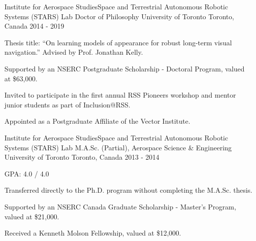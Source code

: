 

\begin{cventries}

  \cventry
    {Institute for Aerospace Studies{\enskip\cdotp\enskip}Space and Terrestrial Autonomous Robotic Systems (STARS) Lab} %
    {Doctor of Philosophy {\enskip\cdotp\enskip}University of Toronto} %
    {Toronto, Canada} %
    {2014 - 2019} %
    {
      \begin{cvitems} %
        \item {Thesis title: ``On learning models of appearance for robust long-term visual navigation.'' Advised by Prof. Jonathan Kelly.}
        \item {Supported by an NSERC Postgraduate Scholarship - Doctoral Program, valued at \$63,000.}
        \item {Invited to participate in the first annual RSS Pioneers workshop and mentor junior students as part of Inclusion@RSS.}
        \item {Appointed as a Postgraduate Affiliate of the Vector Institute.}
      \end{cvitems}
    }

  \cventry
    {Institute for Aerospace Studies{\enskip\cdotp\enskip}Space and Terrestrial Autonomous Robotic Systems (STARS) Lab} %
    {M.A.Sc. (Partial), Aerospace Science \& Engineering {\enskip\cdotp\enskip}University of Toronto} %
    {Toronto, Canada} %
    {2013 - 2014} %
    {
      \begin{cvitems} %
        \item {GPA: 4.0 / 4.0}
        \item {Transferred directly to the Ph.D. program without completing the M.A.Sc. thesis.}
        \item {Supported by an NSERC Canada Graduate Scholarship - Master’s Program, valued at \$21,000.}
        \item {Received a Kenneth Molson Fellowship, valued at \$12,000.}
      \end{cvitems}
    }


\end{cventries}
